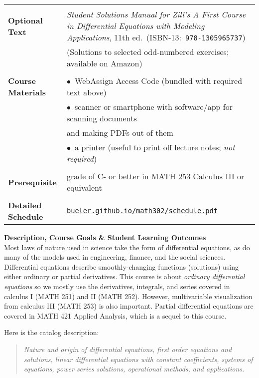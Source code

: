 \documentclass[12pt]{article}
\renewcommand{\emph}[1]{\textsf{\textbf{#1}}}
\newcommand{\localhead}[1]{\par\smallskip\textbf{#1}\nobreak\\}%
\def\heading#1{\localhead{\large\emph{#1}}}
\begin{document}
\begin{tabularx}{\textwidth}{lX}
 & \\
\emph{Optional Text}     & \textit{Student Solutions Manual for Zill's A First Course in Differential Equations with Modeling Applications}, 11th ed.~(ISBN-13:\, \texttt{978-1305965737}) \\
    & (Solutions to selected odd-numbered exercises; available on Amazon) \\
 & \\
\emph{Course Materials}  & $\bullet$\, WebAssign Access Code (bundled with required text above) \\
                         & $\bullet$\, scanner or smartphone with software/app for scanning documents \\
                         & \quad and making PDFs out of them \\
                         & $\bullet$\, a printer (useful to print off lecture notes; \textsl{not required}) \\
 & \\
\emph{Prerequisite}      & grade of C- or better in MATH 253 Calculus III or equivalent \\
 & \\
\emph{Detailed Schedule} & \href{https://bueler.github.io/math302/schedule.pdf}{\tt bueler.github.io/math302/schedule.pdf}
\end{tabularx}

\vfill

\newpage
\cfoot{\thepage}
\strut

\heading{Description, Course Goals \& Student Learning Outcomes}
Most laws of nature used in science take the form of differential equations, as do many of the models used in engineering, finance, and the social sciences.  Differential equations describe smoothly-changing functions (solutions) using either ordinary or partial derivatives.  This course is about \textsl{ordinary differential equations} so we mostly use the derivatives, integrals, and series covered in calculus I (MATH 251) and II (MATH 252).  However, multivariable visualization from calculus III (MATH 253) is also important.  Partial differential equations are covered in MATH 421 Applied Analysis, which is a sequel to this course.

Here is the catalog description:
\begin{quote}
\textsl{Nature and origin of differential equations, first order equations and solutions, linear differential equations with constant coefficients, systems of equations, power series solutions, operational methods, and applications.}
\end{quote}
\end{document}

